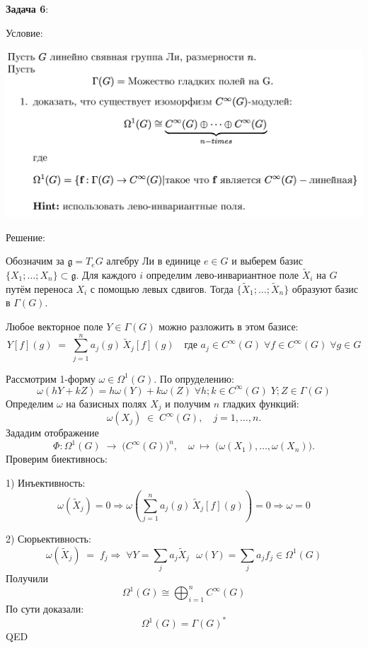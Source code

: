 \documentclass[12pt]{article}
\begin{document}
\begin{large}
\par \textbf{Задача 6}:
\par Условие:
\par
\includegraphics[width=1\textwidth]{photo_6.png}
\par Решение:
\par Обозначим за $\mathfrak{g} = T_e G$ алгебру Ли в единице $e\in G$ и выберем базис
$\{X_1;\dots;X_n\}\subset \mathfrak{g}$.
Для каждого $i$ определим лево-инвариантное поле $\widetilde{X}_i$ на $G$ путём переноса $X_i$ с помощью левых сдвигов.
Тогда $\{\widetilde{X}_1;\dots;\widetilde{X}_n\}$ образуют базис в $\Gamma(G)$.
\par Любое векторное поле $Y\in \Gamma(G)$ можно разложить в этом базисе:
\[
    Y[f](g) \;=\;\sum_{j=1}^n a_j(g)\,\widetilde{X}_j[f](g) \quad \text{где } a_j \in C^\infty(G) \; \forall f \in C^\infty(G) \; \forall g \in G
\]

Рассмотрим 1-форму $\omega \in \Omega^1(G)$. По опруделению:
\[
    \omega \left( h Y + k Z \right) = h \omega \left( Y \right) + k \omega \left( Z \right) \; \forall h; k \in C^\infty(G) \; Y; Z \in \Gamma(G)
\]
Определим \(\omega\) на базисных полях \(X_j\) и получим \(n\) гладких функций:
\[
\omega(X_j)\;\in\;C^\infty(G),\quad j=1,\dots,n.
\]
Зададим отображение
\[
\Phi \colon \Omega^1(G) \;\longrightarrow\;\bigl(C^\infty(G)\bigr)^n,
\quad
\omega \;\mapsto\;\bigl(\omega(X_1),\dots,\omega(X_n)\bigr).
\]
Проверим биективнось:
\par 1) Инъективность:
\[
    \omega(\widetilde{X}_j)=0 \Rightarrow \omega \left(\sum_{j=1}^n a_j(g) \,\widetilde{X}_j[f](g) \right) = 0 \Rightarrow \omega = 0
\]
\par 2) Сюрьективность:
\[
    \omega(\widetilde{X}_j) \;=\; f_j \Rightarrow \; \forall Y = \sum_j a_j \widetilde{X}_j \, \, \, \, \omega(Y) = \sum_j a_j f_j \in \Omega^1(G)
\]
Получили
\[
    \Omega^1(G) \cong \bigoplus_{i=1}^n C^\infty(G)
\]
По сути доказали:
\[
    \Omega^1(G) = \Gamma(G)^*
\]
QED


\end{large}
\end{document}
